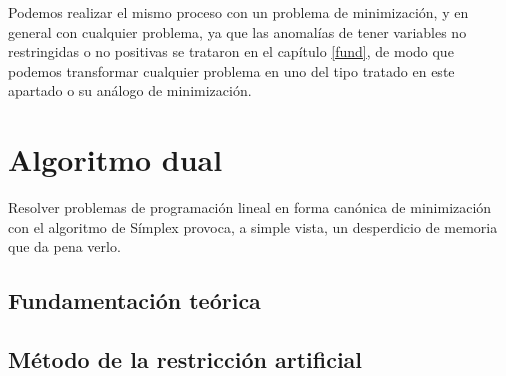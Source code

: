   Podemos realizar el mismo proceso con un problema de minimización, y en general con cualquier problema, ya que las anomalías de tener variables no restringidas o no positivas se trataron en el capítulo \ref{fund}, de modo que podemos transformar cualquier problema en uno del tipo tratado en este apartado o su análogo de minimización.
\section{Algoritmo dual}
Resolver problemas de programación lineal en forma canónica de minimización con el algoritmo de Símplex provoca, a simple vista, un desperdicio de memoria que da pena verlo.
\subsection{Fundamentación teórica}
\subsection{Método de la restricción artificial}